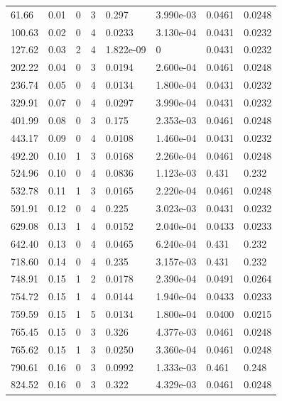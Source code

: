 \documentclass[preview]{standalone}
\begin{document}
{{\begin{tabular}{L{1.2cm}C{1.2cm} C{0.3cm}C{0.5cm} C{1.4cm}C{1.4cm} C{1.4cm}C{1.4cm}}
  61.66  &  0.01  & 0     &  3 &  0.297  & 3.990e-03  & 0.0461 &  0.0248   \\ 
  100.63  &  0.02  & 0     &  4 &  0.0233  & 3.130e-04  & 0.0431 &  0.0232   \\ 
  127.62  &  0.03  & 2     &  4 &  1.822e-09  & 0  & 0.0431 &  0.0232   \\ 
  202.22  &  0.04  & 0     &  3 &  0.0194  & 2.600e-04  & 0.0461 &  0.0248   \\ 
  236.74  &  0.05  & 0     &  4 &  0.0134  & 1.800e-04  & 0.0431 &  0.0232   \\ 
  329.91  &  0.07  & 0     &  4 &  0.0297  & 3.990e-04  & 0.0431 &  0.0232   \\ 
  401.99  &  0.08  & 0     &  3 &  0.175  & 2.353e-03  & 0.0461 &  0.0248   \\ 
  443.17  &  0.09  & 0     &  4 &  0.0108  & 1.460e-04  & 0.0431 &  0.0232   \\ 
  492.20  &  0.10  & 1     &  3 &  0.0168  & 2.260e-04  & 0.0461 &  0.0248   \\ 
  524.96  &  0.10  & 0     &  4 &  0.0836  & 1.123e-03  & 0.431 &  0.232   \\ 
  532.78  &  0.11  & 1     &  3 &  0.0165  & 2.220e-04  & 0.0461 &  0.0248   \\ 
  591.91  &  0.12  & 0     &  4 &  0.225  & 3.023e-03  & 0.0431 &  0.0232   \\ 
  629.08  &  0.13  & 1     &  4 &  0.0152  & 2.040e-04  & 0.0433 &  0.0233   \\ 
  642.40  &  0.13  & 0     &  4 &  0.0465  & 6.240e-04  & 0.431 &  0.232   \\ 
  718.60  &  0.14  & 0     &  4 &  0.235  & 3.157e-03  & 0.431 &  0.232   \\ 
  748.91  &  0.15  & 1     &  2 &  0.0178  & 2.390e-04  & 0.0491 &  0.0264   \\ 
  754.72  &  0.15  & 1     &  4 &  0.0144  & 1.940e-04  & 0.0433 &  0.0233   \\ 
  759.59  &  0.15  & 1     &  5 &  0.0134  & 1.800e-04  & 0.0400 &  0.0215   \\ 
  765.45  &  0.15  & 0     &  3 &  0.326  & 4.377e-03  & 0.0461 &  0.0248   \\ 
  765.62  &  0.15  & 1     &  3 &  0.0250  & 3.360e-04  & 0.0461 &  0.0248   \\ 
  790.61  &  0.16  & 0     &  3 &  0.0992  & 1.333e-03  & 0.461 &  0.248   \\ 
  824.52  &  0.16  & 0     &  3 &  0.322  & 4.329e-03  & 0.0461 &  0.0248   \\ 

\end{tabular}}}
\end{document}
